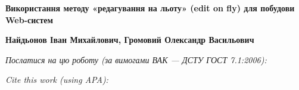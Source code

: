 \documentclass[a4paper,14pt,article]{memoir}
\newcommand{\articleTitleUkr}{
	Використання методу «редагування на льоту» (edit on fly) для побудови Web-систем}
\renewcommand{\authorFullNameUkr}{Найдьонов Іван Михайлович, Громовий Олександр Васильович}
\begin{document}
	
	\begin{center}
		\par\textbf{\MakeUppercase\articleTitleUkr}
		\par\textbf{\authorFullNameUkr}
	\end{center}
	
	\par\bigskip\textit{Послатися на цю роботу (за вимогами ВАК --- ДСТУ ГОСТ 7.1:2006):}
	\par{}
	\par\bigskip\textit{Cite this work (using APA):}
	\par{}
	
	
\end{document}
